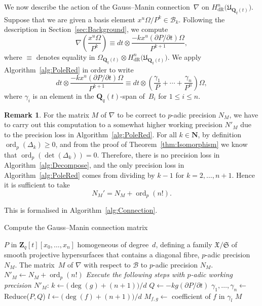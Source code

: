 \documentclass[a4paper,11pt]{article}
\numberwithin{equation}{section}
\newcommand{\NN}{\mathbf{N}} %
\newcommand{\ZZ}{\mathbf{Z}} %
\newcommand{\QQ}{\mathbf{Q}} %
\DeclareMathOperator{\ord}{ord}          %
\providecommand{\HdR}{H_{\text{dR}}}    %
\providecommand{\cB}{\mathcal{B}} %
\theoremstyle{definition}
\newtheorem{rem}[thm]{Remark}
\begin{document}
We now describe the action of the Gauss--Manin connection~$\nabla$ on 
$\HdR^n\bigl(\mathfrak{U}_{\QQ_q(t)}\bigr)$.  Suppose that we are given a basis element 
$x^u \Omega / P^k \in \cB_k$.  Following the description in 
Section~\ref{sec:Background}, we compute
\begin{equation} \label{eqn:nabla}
\nabla \left(\frac{x^u \Omega}{P^k}\right) \equiv 
    dt \otimes \frac{- k x^u (\partial P / \partial t) \Omega}{P^{k+1}},
\end{equation}
where $\equiv$ denotes equality in 
$\Omega_{\QQ_q(t)} \otimes \HdR^n\bigl(\mathfrak{U}_{\QQ_q(t)}\bigr)$. 
We apply Algorithm~\ref{alg:PoleRed} in order to write
\begin{equation}
dt \otimes \frac{- k x^u (\partial P / \partial t) \Omega}{P^{k+1}} \equiv 
dt \otimes \left( \frac{\gamma_{1}}{P} + \dotsb + \frac{\gamma_n}{P^n} \right) \Omega,
\end{equation}
where $\gamma_i$ is an element in the $\QQ_q(t)$-span of~$B_i$ for $1 \leq i \leq n$. 

\begin{rem} \label{rem:precgm}
For the matrix $M$ of $\nabla$ to be correct to $p$-adic precision $N_M$, we have to 
carry out this computation to a somewhat higher working precision $N'_M$ due to the 
precision loss in Algorithm~\ref{alg:PoleRed}. 
For all $k \in \NN$, by definition $\ord_p(\Delta_k) \geq 0$, and from the proof
of Theorem~\ref{thm:Isomorphism} we know that $\ord_p(\det(\Delta_k))=0$. 
Therefore, there is no precision loss 
in Algorithm~\ref{alg:Decompose}, and the only precision loss in Algorithm~\ref{alg:PoleRed} 
comes from dividing by $k-1$ for $k=2,\dotsc,n+1$. Hence it is sufficient to take 
\begin{equation*}
N_M'=N_M + \ord_p(n!).
\end{equation*}
\end{rem}
This is formalised in Algorithm~\ref{alg:Connection}.

\begin{algorithm}
\caption{Compute the Gauss--Manin connection matrix}
\label{alg:Connection}
\begin{algorithmic}
\Require $P$ in $\ZZ_q[t][x_0, \dotsc, x_n]$ homogeneous of degree~$d$, 
         defining a family $\mathfrak{X}/\mathfrak{S}$ of smooth projective 
         hypersurfaces that contains a diagonal fibre, $p$-adic precision $N_M$.
\Ensure  The matrix~$M$ of $\nabla$ with respect to $\cB$ to $p$-adic precision $N_M$.
\State $N'_M \gets N_M + \ord_p(n!)$
\State \textit{Execute the following steps with $p$-adic working precision $N'_M$}:
\State $k \gets  \bigl(\deg(g)+(n+1)\bigr)/d$
\State $Q \gets  - k g (\partial P / \partial t)$
\State $\gamma_{1}, \dotsc, \gamma_n \gets$ {\sc Reduce($P,Q$)} 
\State $l \gets \bigl(\deg(f)+(n+1)\bigr)/d$
\State $M_{f,g} \gets$ coefficient of $f$ in $\gamma_l$
\EndFor
\EndFor
\Return $M$
\EndProcedure
\end{algorithmic}
\end{algorithm}
\end{document}
